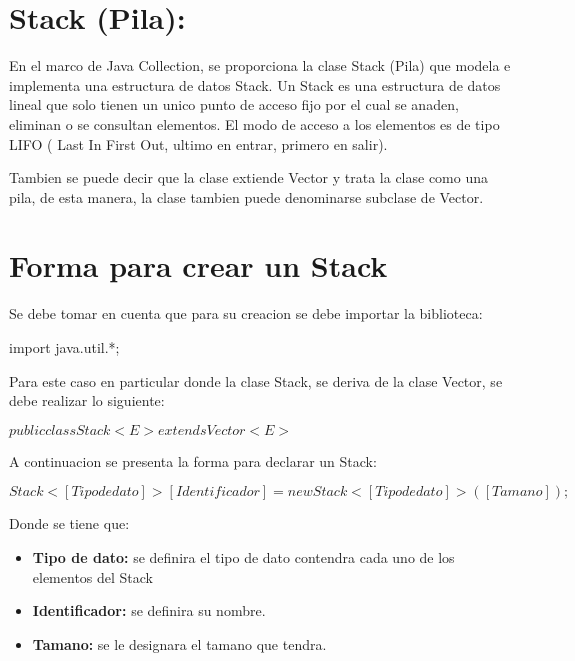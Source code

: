 \documentclass[12pt, letterpaper]{article} %
\begin{document}
\section*{Stack (Pila):}
En el marco de Java Collection, se proporciona la clase Stack (Pila) que modela e implementa una estructura de datos Stack. Un Stack es una estructura de datos lineal que solo tienen un unico punto de acceso fijo por el cual se anaden, eliminan o se consultan elementos. El modo de acceso a los elementos es de tipo LIFO ( Last In First Out, ultimo en entrar, primero en salir).

Tambien se puede decir que la clase extiende Vector y trata la clase como una pila, de esta manera, la clase tambien puede denominarse subclase de Vector.
\section*{Forma para crear un Stack}
Se debe tomar en cuenta que para su creacion se debe importar la biblioteca:

\begin{center}
    import java.util.*;
\end{center}

Para este caso en particular donde la clase Stack, se deriva de la clase Vector, se debe realizar lo siguiente:
\begin{center}
    $public class Stack<E> extends Vector<E>$
\end{center}
A continuacion se presenta la forma para declarar un Stack:
\begin{center}
    $Stack<[Tipo de dato]> [Identificador] = new Stack<[Tipo de dato]>([Tamano]);$
\end{center}
Donde se tiene que:
\begin{itemize}
    \item \textbf{Tipo de dato:} se definira el tipo de dato contendra cada uno de los elementos del Stack
    \item \textbf{Identificador:} se definira su nombre.
    \item \textbf{Tamano:} se le designara el tamano que tendra.
\end{itemize}
\end{document}
